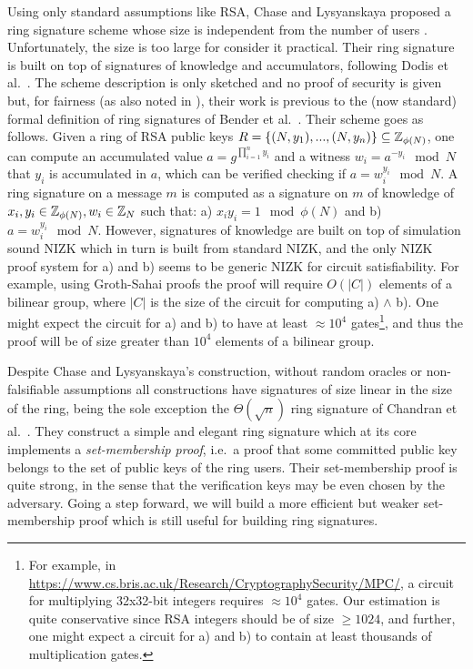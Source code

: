 Using only standard assumptions like RSA, Chase and Lysyanskaya proposed a ring signature scheme whose size is independent from the number of users \cite{C:ChaLys06}. Unfortunately, the size is too large for consider it practical.
Their ring signature is built on top of
signatures of knowledge and accumulators, following Dodis et al.~\cite{EC:DKNS04}. The scheme description is only sketched and no proof of security is given but, for fairness (as also noted in \cite{AC:MalSch17}), their work is previous to the (now standard) formal definition of ring signatures of Bender et al.~\cite{TCC:BenKatMor06}. Their scheme goes as follows.
Given a ring of RSA public keys $R = \{(N,y_1),...,(N,y_n)\}\subseteq \mathbb{Z}_{\phi(N)}$, one can compute an accumulated value $a = g^{\prod_{i=1}^n y_i}$ and a witness $w_i = a^{-y_i} \mod N$ that $y_i$ is accumulated in $a$, which can be verified checking if $a = w_i^{y_i} \mod N$. A ring signature on a message $m$ is computed as a signature on $m$ of knowledge of $x_i,y_i\in \mathbb{Z}_{\phi(N)}, w_i\in \mathbb{Z}_N$ such that: a) $x_iy_i = 1 \mod \phi(N)$ and b)  $a = w_i^{y_i} \mod N$. However, signatures of knowledge are built on top of simulation sound NIZK which in turn is built from standard NIZK, and the only NIZK proof system for a) and b) seems to be generic NIZK for circuit satisfiability. For example, using Groth-Sahai proofs the proof will require $O(|C|)$ elements of a bilinear group, where $|C|$ is the size of the circuit for computing a) $\wedge$ b). One might expect the circuit for a) and b) to have at least $\approx 10^4$ gates\footnote{For example, in \url{https://www.cs.bris.ac.uk/Research/CryptographySecurity/MPC/}, a circuit for multiplying 32x32-bit integers requires $\approx 10^4$ gates. Our estimation is quite conservative since RSA integers should be of size $\geq 1024$, and further, one might expect a circuit for a) and b) to contain at least thousands of multiplication gates.}, and thus the proof will be of size greater than $10^4$ elements of a bilinear group. %

Despite Chase and Lysyanskaya's construction, without random oracles or non-falsifiable assumptions all constructions have signatures of size linear in the size of the ring, being the sole exception the $\Theta(\sqrt{n})$ ring signature of Chandran et al.~\cite{ICALP:ChaGroSah07}. They construct a simple and elegant ring signature which at its core implements a \emph{set-membership proof}, i.e.~a proof that some committed public key belongs to the set of public keys of the ring users. Their set-membership proof is quite strong, in the sense that the verification keys may be even chosen by the adversary. Going a step forward, we will build a more efficient but weaker set-membership proof which is still useful for building ring signatures.

